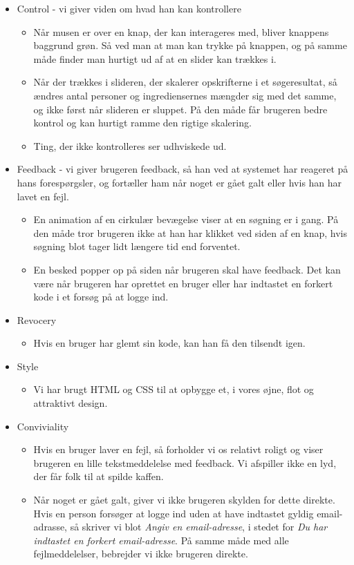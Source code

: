 \begin{itemize}
\item Control - vi giver viden om hvad han kan kontrollere
  \begin{itemize}
    \item Når musen er over en knap, der kan interageres med, bliver knappens baggrund grøn. Så ved man at man kan trykke på knappen, og på samme måde finder man hurtigt ud af at en slider kan trækkes i.
    \item Når der trækkes i slideren, der skalerer opskrifterne i et søgeresultat, så ændres antal personer og ingrediensernes mængder sig med det samme, og ikke først når slideren er sluppet. På den måde får brugeren bedre kontrol og kan hurtigt ramme den rigtige skalering.
    \item Ting, der ikke kontrolleres ser udhviskede ud.
  \end{itemize}
  
\item Feedback - vi giver brugeren feedback, så han ved at systemet har reageret på hans forespørgsler, og fortæller ham når noget er gået galt eller hvis han har lavet en fejl.
  \begin{itemize}
  \item En animation af en cirkulær bevægelse viser at en søgning er i gang. På den måde tror brugeren ikke at han har klikket ved siden af en knap, hvis søgning blot tager lidt længere tid end forventet.
  \item En besked popper op på siden når brugeren skal have feedback. Det kan \fx være når brugeren har oprettet en bruger eller har indtastet en forkert kode i et forsøg på at logge ind.
  \end{itemize}

\item Revocery
\begin{itemize}
  \item Hvis en bruger har glemt sin kode, kan han få den tilsendt igen.
\end{itemize}

\item Style
\begin{itemize}
  \item Vi har brugt HTML og CSS til at opbygge et, i vores øjne, flot og attraktivt design.
\end{itemize}

\item Conviviality
\begin{itemize}
  \item Hvis en bruger laver en fejl, så forholder vi os relativt roligt og viser brugeren en lille tekstmeddelelse med feedback. Vi afspiller ikke en lyd, der får folk til at spilde kaffen.
  \item Når noget er gået galt, giver vi ikke brugeren skylden for dette direkte. Hvis en person forsøger at logge ind uden at have indtastet gyldig email-adrasse, så skriver vi blot \textit{Angiv en email-adresse}, i stedet for \textit{Du har indtastet en forkert email-adresse}. På samme måde med alle fejlmeddelelser, bebrejder vi ikke brugeren direkte.
\end{itemize}

\end{itemize}
